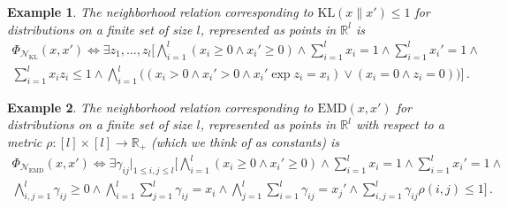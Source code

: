 \documentclass[11pt]{article}
\theoremstyle{plain}
\newtheorem{example}{Example}[section]
\theoremstyle{definition}
\theoremstyle{remark}
\begin{document}
\begin{example}
\label{app:example-kl-definability}
The neighborhood relation corresponding to \(\mathrm{KL}(x\|x') \leq 1\) for distributions on a finite set of size \(l\), represented as points in \(\mathbb R^l\) is
\begin{multline*}
 \Phi_{\mathcal N_{\mathrm{KL}}}(x,x') \iff \exists z_1,\dots,z_l \Bigg[
 \bigwedge_{i=1}^l (x_i \ge 0 \land x_i' \ge 0) \land \sum_{i=1}^l x_i = 1 \land \sum_{i=1}^l x_i' = 1 \land \\ \sum_{i=1}^l x_i z_i \leq 1 \land
 \bigwedge_{i=1}^l \bigl((x_i > 0 \land x_i' > 0 \land x_i' \exp z_i = x_i)\lor(x_i = 0 \land z_i = 0)\bigr)
 \Bigg] \,.
\end{multline*}
\end{example}

\begin{example}
\label{app:example-emd-definability}
The neighborhood relation corresponding to \(\mathrm{EMD}(x,x')\) for distributions on a finite set of size \(l\), represented as points in \(\mathbb R^l\) with respect to a metric \(\rho\colon [l] \times [l] \to \mathbb{R}_+\) (which we think of as constants) is
\begin{multline*}
 \Phi_{\mathcal N_{\mathrm{EMD}}}(x,x') \iff \exists \gamma_{ij}|_{1 \leq i,j \leq l} \Bigg[
 \bigwedge_{i=1}^l (x_i \ge 0 \land x_i' \ge 0) \land \sum_{i=1}^l x_i = 1 \land \sum_{i=1}^l x_i' = 1 \land \\  \bigwedge_{i,j=1}^l \gamma_{ij} \ge 0 \land
 \bigwedge_{i=1}^l \sum_{j=1}^l \gamma_{ij} = x_i \land
 \bigwedge_{j=1}^l \sum_{i=1}^l \gamma_{ij} = x_j' \land
 \sum_{i,j=1}^l \gamma_{ij} \rho(i,j) \leq 1
 \Bigg] \,.
\end{multline*}
\end{example}
\end{document}
